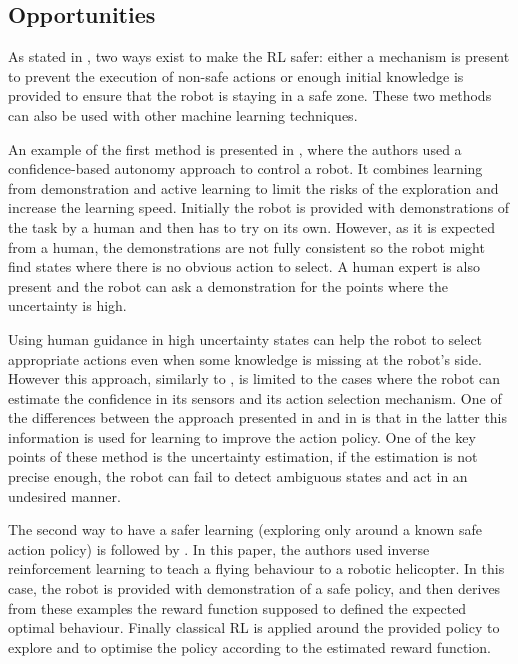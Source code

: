 \subsection{Opportunities}    
    As stated in \citet{garcia2015comprehensive}, two ways exist to make the RL
    safer: either a mechanism is present to prevent the execution of non-safe
    actions or enough initial knowledge is provided to ensure that the robot is
    staying in a safe zone. These two methods can also be used with other
    machine learning techniques. 
    
    An example of the first method is presented in \citet{chernova2009}, where
    the authors used a confidence-based autonomy approach to control a robot. It
    combines learning from demonstration and active learning
    \citep{johnson1991active} to limit the risks of the exploration and increase
    the learning speed. Initially the robot is provided with demonstrations of
    the task by a human and then has to try on its own. However, as it is
    expected from a human, the demonstrations are not fully consistent so the
    robot might find states where there is no obvious action to select. A human
    expert is also present and the robot can ask a demonstration for the points
    where the uncertainty is high. 
    
    Using human guidance in high uncertainty states can help the robot to select
    appropriate actions even when some knowledge is missing at the robot's side.
    However this approach, similarly to \citet{shiomi2008semi}, is limited to
    the cases where the robot can estimate the confidence in its sensors and its
    action selection mechanism. One of the differences between the approach
    presented in \citet{shiomi2008semi} and in \citet{chernova2009} is that in
    the latter this information is used for learning to improve the action
    policy. One of the key points of these method is the uncertainty estimation,
    if the estimation is not precise enough, the robot can fail to detect
    ambiguous states and act in an undesired manner.
    
    The second way to have a safer learning (exploring only around a known safe
    action policy) is followed by \citet{Abbeel2004}. In this paper, the authors
    used inverse reinforcement learning to teach a flying behaviour to a robotic
    helicopter. In this case, the robot is provided with demonstration of a safe
    policy, and then derives from these examples the reward function supposed to
    defined the expected optimal behaviour. Finally classical RL is applied
    around the provided policy to explore and to optimise the policy according
    to the estimated reward function.
    
